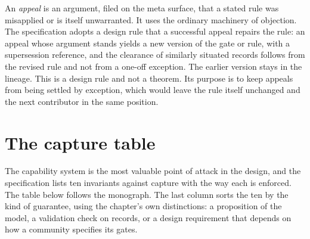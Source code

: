 \documentclass[11pt]{article}
\begin{document}
An \emph{appeal} is an argument, filed on the meta surface, that a stated rule was misapplied or is itself unwarranted. It uses the ordinary machinery of objection. The specification adopts a design rule that a successful appeal repairs the rule: an appeal whose argument stands yields a new version of the gate or rule, with a supersession reference, and the clearance of similarly situated records follows from the revised rule and not from a one-off exception. The earlier version stays in the lineage. This is a design rule and not a theorem. Its purpose is to keep appeals from being settled by exception, which would leave the rule itself unchanged and the next contributor in the same position.

\section{The capture table}\label{sec:capture}

The capability system is the most valuable point of attack in the design, and the specification lists ten invariants against capture with the way each is enforced. The table below follows the monograph. The last column sorts the ten by the kind of guarantee, using the chapter's own distinctions: a proposition of the model, a validation check on records, or a design requirement that depends on how a community specifies its gates.
\end{document}
